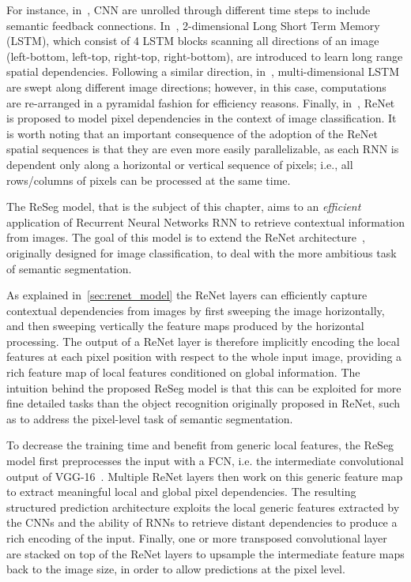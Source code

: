 For instance, in~\cite{Pinheiro:2014, Gatta14-deepvision}, CNN are unrolled
through different time steps to include semantic feedback connections.
In~\cite{byeon2015scene}, 2-dimensional Long Short Term Memory (LSTM), which
consist of 4 LSTM blocks scanning all directions of an image (left-bottom,
left-top, right-top, right-bottom), are introduced to learn long range spatial
dependencies. Following a similar direction, in~\cite{stollenga2015parallel},
multi-dimensional LSTM are swept along different image directions; however, in
this case, computations are re-arranged in a pyramidal fashion for efficiency
reasons. Finally, in~\cite{visin2015renet}, ReNet is proposed to model pixel
dependencies in the context of image classification. It is worth noting that
an important consequence of the adoption of the ReNet spatial sequences is
that they are even more easily parallelizable, as each RNN is dependent only
along a horizontal or vertical sequence of pixels; i.e., all rows/columns of
pixels can be processed at the same time.

The ReSeg model, that is the subject of this chapter, aims to an {\em
efficient} application of Recurrent Neural Networks RNN to retrieve contextual
information from images. The goal of this model is to extend the ReNet
architecture~\cite{visin2015renet}, originally designed for image
classification, to deal with the more ambitious task of semantic segmentation.

As explained in~\autoref{sec:renet_model} the ReNet layers can efficiently
capture contextual dependencies from images by first sweeping the image
horizontally, and then sweeping vertically the feature maps produced by the
horizontal processing. The output of a ReNet layer is therefore implicitly
encoding the local features at each pixel position with respect to the whole
input image, providing a rich feature map of local features conditioned on
global information. The intuition behind the proposed ReSeg model is that this
can be exploited for more fine detailed tasks than the object recognition
originally proposed in ReNet, such as to address the pixel-level task of
semantic segmentation.

To decrease the training time and benefit from generic local features, the
ReSeg model first preprocesses the input with a FCN, i.e. the intermediate
convolutional output of VGG-16~\cite{Simonyan2015}. Multiple ReNet layers then
work on this generic feature map to extract meaningful local and global pixel
dependencies.
The resulting structured prediction architecture exploits the local generic
features extracted by the CNNs and the ability of RNNs to retrieve distant
dependencies to produce a rich encoding of the input. Finally, one or more
transposed convolutional layer are stacked on top of the ReNet layers to
upsample the intermediate feature maps back to the image size, in order to
allow predictions at the pixel level.

